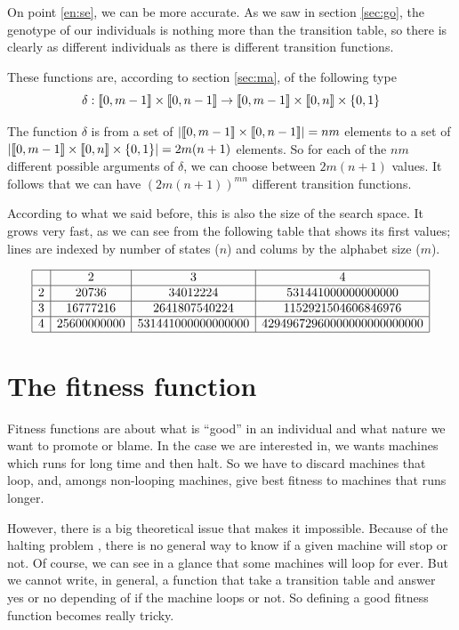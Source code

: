 \documentclass{report}
\begin{document}
On point \ref{en:se}, we can be more accurate. As we saw in section \ref{sec:go}, the genotype of our individuals is nothing more than the transition table, so there is clearly as different individuals as there is different transition functions.

These functions are, according to section \ref{sec:ma}, of the following type
\[
  \delta : \llbracket 0, m-1 \rrbracket \times \llbracket 0, n-1 \rrbracket \to \llbracket 0, m-1 \rrbracket \times \llbracket 0, n \rrbracket \times \{0,1\}
\]

The function $\delta$ is from a set of $|\llbracket 0, m-1 \rrbracket \times \llbracket 0, n-1 \rrbracket| = nm$ elements to a set of $|\llbracket 0, m-1 \rrbracket \times \llbracket 0, n \rrbracket \times \{0,1\}| = 2m(n+1)$ elements. So for each of the $nm$ different possible arguments of $\delta$, we can choose between $2m(n+1)$ values.
It follows that we can have $(2 m (n+1))^{mn}$ different transition functions.

According to what we said before, this is also the size of the search space. It grows very fast, as we can see from the following table that shows its first values; lines are indexed by number of states ($n$) and colums by the alphabet size ($m$).

\[
\begin{array}{|c|c|c|c|c|}
  \hline
    & 2         & 3              & 4\\
  \hline
  2 & 20736     &34012224          &531441000000000000\\
  \hline
  3 &16777216   &2641807540224     &1152921504606846976\\
  \hline
  4 &25600000000&531441000000000000&42949672960000000000000000\\
  \hline
\end{array}
\]

\section{The fitness function}
\label{sec:fitness}

Fitness functions are about what is ``good'' in an individual and what nature we want to promote or blame.
In the case we are interested in, we wants machines which runs for long time and then halt. So we have to discard machines that loop, and, amongs non-looping machines, give best fitness to machines that runs longer.

However, there is a big theoretical issue that makes it impossible. Because of the halting problem \cite{turing}, there is no general way to know if a given machine will stop or not. Of course, we can see in a glance that some machines will loop for ever. But we cannot write, in general, a function that take a transition table and answer yes or no depending of if the machine loops or not. So defining a good fitness function becomes really tricky.
\end{document}
